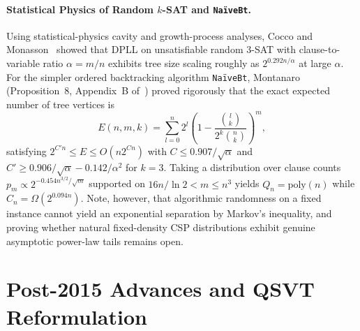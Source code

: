 \documentclass[11pt,a4paper]{article}
\begin{document}
\paragraph{Statistical Physics of Random $k$-SAT and \texttt{Na\"iveBt}.}
Using statistical-physics cavity and growth-process analyses, Cocco and Monasson~\cite{cocco2001} showed that DPLL on unsatisfiable random 3-SAT with clause-to-variable ratio $\alpha = m/n$ exhibits tree size scaling roughly as $2^{0.292 n / \alpha}$ at large $\alpha$. For the simpler ordered backtracking algorithm \texttt{Na\"iveBt}, Montanaro (Proposition~8, Appendix~B of~\cite{montanaro2015}) proved rigorously that the exact expected number of tree vertices is
\[
E(n, m, k) = \sum_{l=0}^{n} 2^l \left(1 - \frac{\binom{l}{k}}{2^k \binom{n}{k}}\right)^m,
\]
satisfying $2^{C' n} \le E \le O(n 2^{C n})$ with $C \le 0.907/\sqrt{\alpha}$ and $C' \ge 0.906/\sqrt{\alpha} - 0.142/\alpha^2$ for $k=3$. Taking a distribution over clause counts $p_m \propto 2^{-0.454 n^{3/2}/\sqrt{m}}$ supported on $16n/\ln 2 < m \le n^3$ yields $Q_n = \mathrm{poly}(n)$ while $C_n = \Omega(2^{0.094 n})$. Note, however, that algorithmic randomness on a fixed instance cannot yield an exponential separation by Markov's inequality, and proving whether natural fixed-density CSP distributions exhibit genuine asymptotic power-law tails remains open.

\section{Post-2015 Advances and QSVT Reformulation}
\end{document}
